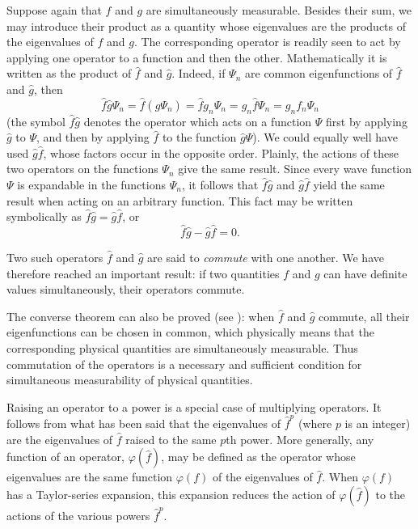 Suppose again that $f$ and $g$ are simultaneously measurable. Besides their
sum, we may introduce their product as a quantity whose eigenvalues are the
products of the eigenvalues of $f$ and $g$. The corresponding operator is
readily seen to act by applying one operator to a function and then the other.
Mathematically it is written as the product of $\hat f$ and $\hat g$. Indeed,
if $\Psi_n$ are common eigenfunctions of $\hat f$ and $\hat g$, then
\[
  \hat f\hat g\Psi_n=\hat f(\hat g\Psi_n)
  =\hat f g_n\Psi_n=g_n\hat f\Psi_n=g_nf_n\Psi_n
\]
(the symbol $\hat f\hat g$ denotes the operator which acts on a function
$\Psi$ first by applying $\hat g$ to $\Psi$, and then by applying $\hat f$ to
the function $\hat g\Psi$). We could equally well have used $\hat g\hat f$,
whose factors occur in the opposite order. Plainly, the actions of these two
operators on the functions $\Psi_n$ give the same result. Since every wave
function $\Psi$ is expandable in the functions $\Psi_n$, it follows that
$\hat f\hat g$ and $\hat g\hat f$ yield the same result when acting on
an arbitrary function. This fact may be written symbolically as
$\hat f\hat g=\hat g\hat f$, or
\begin{equation}
  \hat f\hat g-\hat g\hat f=0.
  \tag{4.3}
\end{equation}

Two such operators $\hat f$ and $\hat g$ are said to \emph{commute} with one
another. We have therefore reached an important result: if two quantities $f$
and $g$ can have definite values simultaneously, their operators commute.

The converse theorem can also be proved (see ): when $\hat f$ and
$\hat g$ commute, all their eigenfunctions can be chosen in common, which
physically means that the corresponding physical quantities are simultaneously
measurable. Thus commutation of the operators is a necessary and sufficient
condition for simultaneous measurability of physical quantities.

Raising an operator to a power is a special case of multiplying operators. It
follows from what has been said that the eigenvalues of $\hat f^p$ (where $p$
is an integer) are the eigenvalues of $\hat f$ raised to the same $p$th power.
More generally, any function of an operator, $\varphi(\hat f)$, may be defined
as the operator whose eigenvalues are the same function $\varphi(f)$ of the
eigenvalues of $\hat f$. When $\varphi(f)$ has a Taylor-series expansion, this
expansion reduces the action of $\varphi(\hat f)$ to the actions of the
various powers $\hat f^p$.

